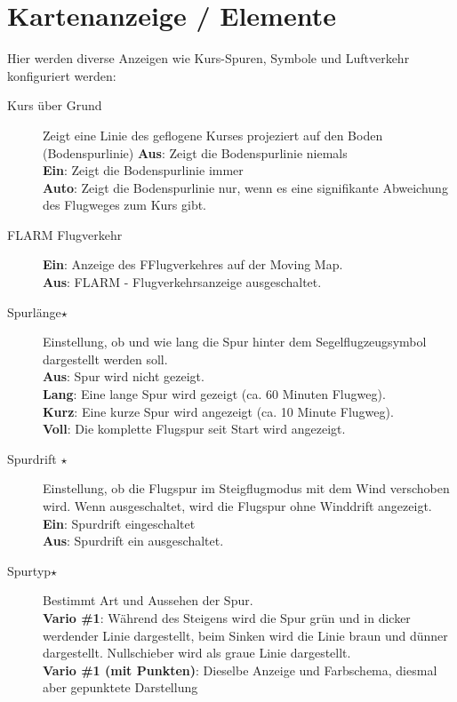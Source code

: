 \section{Kartenanzeige / Elemente}\label{sec:map-elements}
Hier werden diverse Anzeigen wie Kurs-Spuren, Symbole und Luftverkehr konfiguriert werden:
\begin{description}
\item[Kurs über Grund] Zeigt eine Linie des geflogene Kurses projeziert auf den Boden (Bodenspurlinie)
   {\bf Aus}: Zeigt die Bodenspurlinie niemals\\
   {\bf Ein}: Zeigt die Bodenspurlinie immer\\
   {\bf Auto}: Zeigt die Bodenspurlinie nur, wenn es eine signifikante Abweichung des Flugweges zum Kurs gibt.
\item[FLARM Flugverkehr ]
   {\bf Ein}:  \label{conf:flarm-on-map} Anzeige des F\fl Flugverkehres auf der Moving Map.\\
   {\bf Aus}: FLARM - Flugverkehrsanzeige ausgeschaltet.
\item[Spurlänge$\star$] \label{conf:snailtrail} Einstellung, ob und wie lang die Spur hinter dem
Segelflugzeugsymbol dargestellt werden soll. \\
   {\bf Aus}: Spur wird nicht gezeigt. \\
   {\bf Lang}: Eine lange Spur wird gezeigt (ca. 60 Minuten Flugweg).\\
   {\bf Kurz}: Eine kurze Spur wird angezeigt (ca. 10 Minute Flugweg). \\
   {\bf Voll}: Die komplette Flugspur seit Start wird angezeigt.
\item[Spurdrift $\star$] \label{conf:traildrift} Einstellung, ob die Flugspur im Steigflugmodus
mit dem Wind verschoben wird. Wenn ausgeschaltet, wird die Flugspur ohne Winddrift angezeigt.\\
   {\bf Ein}: Spurdrift eingeschaltet\\
   {\bf Aus}: Spurdrift ein ausgeschaltet.
\item[Spurtyp$\star$] \label{conf:snailtype} Bestimmt Art und Aussehen der Spur.\\
  {\bf Vario \#1}: Während des Steigens wird die Spur grün und in dicker werdender Linie dargestellt,
  beim Sinken wird die Linie braun und dünner dargestellt. Nullschieber wird als graue Linie dargestellt.\\
  {\bf Vario \#1 (mit Punkten)}: Dieselbe Anzeige und Farbschema, diesmal aber gepunktete Darstellung

\end{description}
